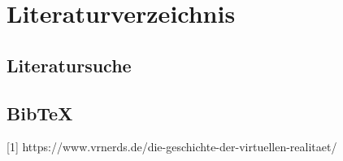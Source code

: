 \documentclass[deutsch]{llncs}
\begin{document}
\section{Literaturverzeichnis}
\label{sec:bib}

\subsection{Literatursuche}
\label{subsec:search}


\subsection{BibTeX}
\label{subsec:bibtex}
[1] https://www.vrnerds.de/die-geschichte-der-virtuellen-realitaet/
\cite{2 http://virtualrealityforeducation.com/wp-content/uploads/2018/06/HuAu_Lee_2017_VRinEd.pdf}

\printbibliography
\end{document}
